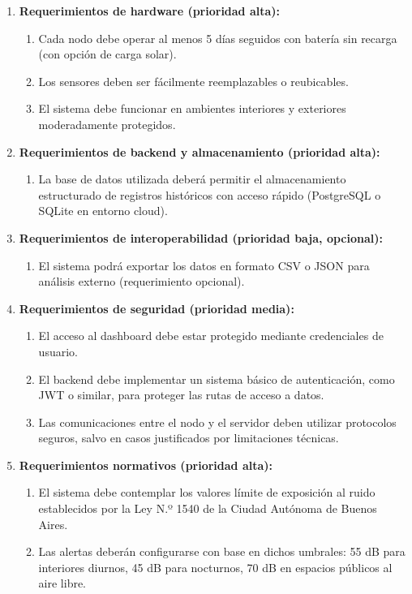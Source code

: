 \documentclass[
11pt, %
]{charter}
\begin{document}
\begin{enumerate}
    \item \textbf{Requerimientos de hardware (prioridad alta):}
    \begin{enumerate}
        \item Cada nodo debe operar al menos 5 días seguidos con batería sin recarga (con opción de carga solar).
        \item Los sensores deben ser fácilmente reemplazables o reubicables.
        \item El sistema debe funcionar en ambientes interiores y exteriores moderadamente protegidos.
    \end{enumerate}

    \item \textbf{Requerimientos de backend y almacenamiento (prioridad alta):}
    \begin{enumerate}
        \item La base de datos utilizada deberá permitir el almacenamiento estructurado de registros históricos con acceso rápido (PostgreSQL o SQLite en entorno cloud).
    \end{enumerate}

    \item \textbf{Requerimientos de interoperabilidad (prioridad baja, opcional):}
    \begin{enumerate}
        \item El sistema podrá exportar los datos en formato CSV o JSON para análisis externo (requerimiento opcional).
    \end{enumerate}

    \item \textbf{Requerimientos de seguridad (prioridad media):}
    \begin{enumerate}
        \item El acceso al dashboard debe estar protegido mediante credenciales de usuario.
        \item El backend debe implementar un sistema básico de autenticación, como JWT o similar, para proteger las rutas de acceso a datos.
        \item Las comunicaciones entre el nodo y el servidor deben utilizar protocolos seguros, salvo en casos justificados por limitaciones técnicas.
    \end{enumerate}

    \item \textbf{Requerimientos normativos (prioridad alta):}
    \begin{enumerate}
        \item El sistema debe contemplar los valores límite de exposición al ruido establecidos por la Ley N.º 1540 de la Ciudad Autónoma de Buenos Aires.
        \item Las alertas deberán configurarse con base en dichos umbrales: 55 dB para interiores diurnos, 45 dB para nocturnos, 70 dB en espacios públicos al aire libre.
    \end{enumerate}
\end{enumerate}
\end{document}
